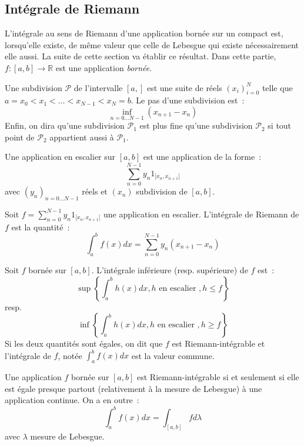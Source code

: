 \subsection{Intégrale de Riemann}
L'intégrale au sens de Riemann d'une application bornée sur un compact est,
lorsqu'elle existe, de m\^eme valeur que celle de Lebesgue qui  existe
nécessairement elle aussi. La suite de cette section va établir ce résultat.
 Dans cette partie, $f : [a,b] \to \mathbb{R}$ est une
application \textit{bornée}.
\begin{defn}
Une subdivision $\mathcal{P}$ de l'intervalle $[a,]$ est une suite de
réels $(x_i)_{i=0}^{N}$ telle que $a=x_0 < x_1 < \dots < x_{N-1} < x_N
= b$. Le pas d'une subdivision est~:
\[
\inf_{n=0\dots N-1} (x_{n+1} -x_n)
\]
Enfin, on dira qu'une subdivision $\mathcal{P}_1$ est plus fine qu'une
subdivision $\mathcal{P}_2$ si tout point de $\mathcal{P}_2$
appartient aussi à $\mathcal{P}_1$.
\end{defn}
\begin{defn}
Une application en escalier sur $[a,b]$ est une application de la
forme~:
\[
\sum_{n=0}^{N-1} y_n 1_{[x_n, x_{n+1}[}
\]
avec $(y_n)_{n=0\dots N-1}$ réels et $(x_n)$ subdivision de $[a,b]$.
\end{defn}
\begin{defn}
Soit $f= \sum_{n=0}^{N-1} y_n 1_{[x_n, x_{n+1}[}$ une application en
    escalier. L'intégrale de Riemann de $f$ est la quantité~:
\[
\int_a^b f(x) dx = \sum_{n=0}^{N-1} y_n (x_{n+1} -x_n)
\]
\end{defn}
\begin{defn}
Soit $f$ bornée sur $[a,b]$. L'intégrale inférieure (resp. supérieure)
de $f$ est~:
\[
\sup \left \{ \int_a^b h(x) dx, h \mbox{ en escalier }, h \leq f \right
\}
\]
resp.
\[
\inf \left \{ \int_a^b h(x) dx, h \mbox{ en escalier }, h \geq f \right
\}
\]
Si les deux quantités sont égales, on dit que $f$ est
Riemann-intégrable et l'intégrale de $f$, notée $\int_a^b f(x) dx$ est
la valeur commune.
\end{defn}
\begin{theorem}
Une application $f$ bornée sur $[a,b]$ est Riemann-intégrable si et
seulement si elle est égale presque partout (relativement à la mesure
de Lebesgue) à une application continue. On a en outre~:
\[
\int_a^b f(x) dx = \int_{[a,b]} f d \lambda
\]
avec $\lambda$ mesure de Lebesgue.
\end{theorem}
